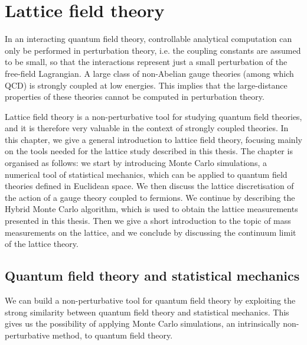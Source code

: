 \chapter{Lattice field theory}

In an interacting quantum field theory, controllable analytical computation can only be performed in perturbation theory, i.e. the coupling constants are assumed to be small, so that the interactions represent just a small perturbation of the free-field Lagrangian. A large class of non-Abelian gauge theories (among which QCD) is strongly coupled at low energies. This implies that the large-distance properties of these theories cannot be computed in perturbation theory. 

Lattice field theory is a non-perturbative tool for studying quantum field theories, and it is therefore very valuable in the context of strongly coupled theories. In this chapter, we give a general introduction to lattice field theory, focusing mainly on the tools needed for the lattice study described in this thesis. The chapter is organised as follows: we start by introducing Monte Carlo simulations, a numerical tool of statistical mechanics, which can be applied to quantum field theories defined in Euclidean space. 
We then discuss the lattice discretisation of the action of a gauge theory coupled to fermions. We continue by describing the Hybrid Monte Carlo algorithm, which is used to obtain the lattice measurements presented in this thesis. Then we give a short introduction to the topic of mass measurements on the lattice, and we conclude by discussing the continuum limit of the lattice theory.



\section{Quantum field theory and statistical mechanics}
\label{QFT-SM}

We can build a non-perturbative tool for quantum field theory by exploiting the strong similarity between quantum field theory and statistical mechanics. This gives us the possibility of applying Monte Carlo simulations, an intrinsically non-perturbative method, to quantum field theory.

